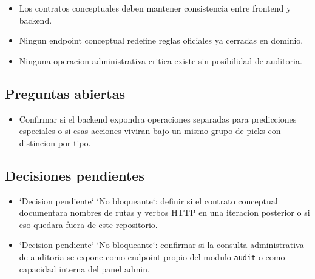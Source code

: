 \begin{itemize}
  \item Los contratos conceptuales deben mantener consistencia entre frontend y backend.
  \item Ningun endpoint conceptual redefine reglas oficiales ya cerradas en dominio.
  \item Ninguna operacion administrativa critica existe sin posibilidad de auditoria.
\end{itemize}

\subsection{Preguntas abiertas}

\begin{itemize}
  \item Confirmar si el backend expondra operaciones separadas para predicciones especiales o si esas acciones viviran bajo un mismo grupo de picks con distincion por tipo.
\end{itemize}

\subsection{Decisiones pendientes}

\begin{itemize}
  \item `Decision pendiente` `No bloqueante`: definir si el contrato conceptual documentara nombres de rutas y verbos HTTP en una iteracion posterior o si eso quedara fuera de este repositorio.
  \item `Decision pendiente` `No bloqueante`: confirmar si la consulta administrativa de auditoria se expone como endpoint propio del modulo \texttt{audit} o como capacidad interna del panel admin.
\end{itemize}
